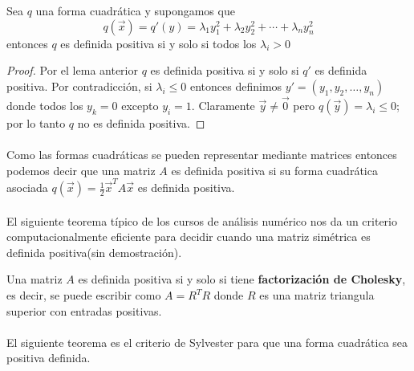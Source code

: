 \begin{theorem}
Sea $q$ una forma cuadrática y supongamos que 
\begin{equation*}
q \left(\overrightarrow{x}\right) = q'(y) = \lambda_{1}y_{1}^{2} + \lambda_{2}y_{2}^{2} + \cdots + \lambda_{n}y_{n}^{2}
\end{equation*}
entonces $q$ es definida positiva si y solo si todos los $\lambda_{i} > 0$
\label{teorema:1.4}
\end{theorem}

\begin{proof}
Por el lema anterior $q$ es definida positiva si y solo si $q'$ es definida positiva. Por contradicción, si $\lambda_{i} \leq 0$ entonces definimos $y' = (y_{1}, y_{2}, \ldots, y_{n})$ donde todos los $y_{k}=0$ excepto $y_{i} = 1$. Claramente $\overrightarrow{y} \neq \overrightarrow{0}$ pero $q(\overrightarrow{y}) = \lambda_{i} \leq 0$; por lo tanto $q$ no es definida positiva.
\end{proof}

\paragraph{}
Como las formas cuadráticas se pueden representar mediante matrices entonces podemos decir que una matriz $A$ es definida positiva si su forma cuadrática asociada $q(\overrightarrow{x}) = \frac{1}{2}\overrightarrow{x}^{T}A\overrightarrow{x}$ es definida positiva.

\paragraph{}
El siguiente teorema típico de los cursos de análisis numérico nos da un criterio computacionalmente eficiente para decidir cuando una matriz simétrica es definida positiva(sin demostración).

\begin{theorem}
Una matriz $A$ es definida positiva si y solo si tiene \textbf{factorización de Cholesky}, es decir, se puede escribir como $A=R^{T}R$ donde $R$ es una matriz triangula superior con entradas positivas.
\label{teorema:1.5}
\end{theorem}

\paragraph{}
El siguiente teorema es el criterio de Sylvester para que una forma cuadrática sea positiva definida.

